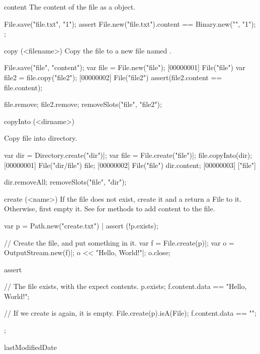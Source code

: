 \begin{urbiscriptapi}
\item[content]
  The content of the file as a  object.
\begin{urbiscript}
File.save("file.txt", "1\n");
assert
{
  File.new("file.txt").content == Binary.new("", "1\n");
};
\end{urbiscript}


\item[copy](<filename>)
  Copy the file to a new file named .
\begin{urbiscript}
File.save("file", "content");
var file = File.new("file");
[00000001] File("file")
var file2 = file.copy("file2");
[00000002] File("file2")
assert(file2.content == file.content);
\end{urbiscript}
\begin{urbicomment}
file.remove;
file2.remove;
removeSlots("file", "file2");
\end{urbicomment}

\item[copyInto](<dirname>)
  \experimental{}

  Copy file into  directory.
\begin{urbiscript}
var dir = Directory.create("dir")|;
var file = File.create("file")|;
file.copyInto(dir);
[00000001] File("dir/file")
file;
[00000002] File("file")
dir.content;
[00000003] ["file"]
\end{urbiscript}
\begin{urbicomment}
dir.removeAll;
removeSlots("file", "dir");
\end{urbicomment}


\item[create](<name>)%
  If the file  does not exist, create it and a return a File to
  it.  Otherwise, first empty it.  See  for methods
  to add content to the file.
\begin{urbiscript}
var p = Path.new("create.txt") |
assert (!p.exists);

// Create the file, and put something in it.
var f = File.create(p)|;
var o = OutputStream.new(f)|;
o << "Hello, World!"|;
o.close;

assert
{
  // The file exists, with the expect contents.
  p.exists;
  f.content.data == "Hello, World!";

  // If we create is again, it is empty.
  File.create(p).isA(File);
  f.content.data == "";
};
\end{urbiscript}


\item[lastModifiedDate]
  \experimental{}


\end{urbiscriptapi}
